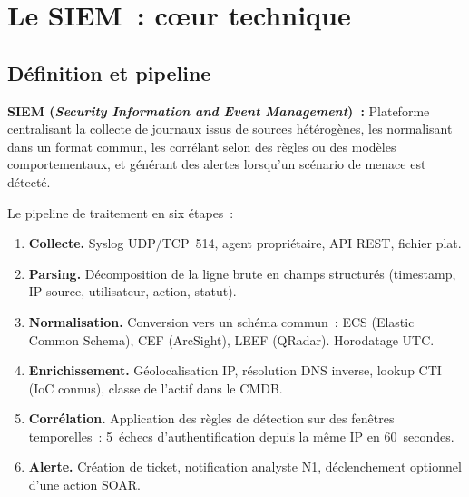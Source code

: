 \section{Le SIEM~: cœur technique}
\label{sec:siem}

\subsection{Définition et pipeline}

\begin{boxdef}
\textbf{SIEM (\textit{Security Information and Event Management})~:}
Plateforme centralisant la collecte de journaux issus de sources hétérogènes,
les normalisant dans un format commun, les corrélant selon des règles
ou des modèles comportementaux, et générant des alertes lorsqu'un scénario
de menace est détecté.
\end{boxdef}

Le pipeline de traitement en six étapes~:

\begin{enumerate}
  \item \textbf{Collecte.} Syslog UDP/TCP~514, agent propriétaire, API REST,
        fichier plat.
  \item \textbf{Parsing.} Décomposition de la ligne brute en champs structurés
        (timestamp, IP source, utilisateur, action, statut).
  \item \textbf{Normalisation.} Conversion vers un schéma commun~: ECS
        (Elastic Common Schema), CEF (ArcSight), LEEF (QRadar). Horodatage UTC.
  \item \textbf{Enrichissement.} Géolocalisation IP, résolution DNS inverse,
        lookup CTI (IoC connus), classe de l'actif dans le CMDB.
  \item \textbf{Corrélation.} Application des règles de détection sur des fenêtres
        temporelles~: \og{}5~échecs d'authentification depuis la même IP
        en 60~secondes\fg{}.
  \item \textbf{Alerte.} Création de ticket, notification analyste N1,
        déclenchement optionnel d'une action SOAR.
\end{enumerate}

